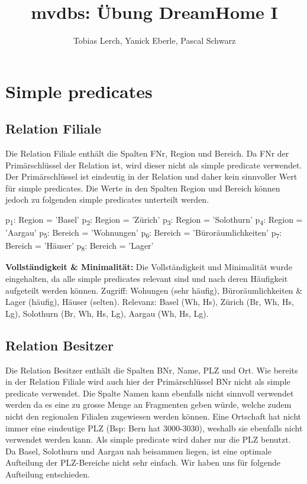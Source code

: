 \documentclass[11pt,a4paper,parskip=half]{scrartcl}
\title{mvdbs: Übung DreamHome I}
\author{Tobias Lerch, Yanick Eberle, Pascal Schwarz}
\begin{document}
\maketitle

\section{Simple predicates}
\subsection{Relation Filiale}
Die Relation Filiale enthält die Spalten FNr, Region und Bereich. Da FNr der Primärschlüssel der Relation ist, wird dieser nicht als simple predicate verwendet. Der Primärschlüssel ist eindeutig in der Relation und daher kein sinnvoller Wert für simple predicates. Die Werte in den Spalten Region und Bereich können jedoch zu folgenden simple predicates unterteilt werden.

p\textsubscript{1}: Region = 'Basel'\newline
p\textsubscript{2}: Region = 'Zürich'\newline
p\textsubscript{3}: Region = 'Solothurn'\newline
p\textsubscript{4}: Region = 'Aargau'\newline
\newline
p\textsubscript{5}: Bereich = 'Wohnungen'\newline
p\textsubscript{6}: Bereich = 'Büroräumlichkeiten'\newline
p\textsubscript{7}: Bereich = 'Häuser'\newline
p\textsubscript{8}: Bereich = 'Lager'\newline

\textbf{Vollständigkeit \& Minimalität: }
Die Vollständigkeit und Minimalität wurde eingehalten, da alle simple predicates relevant sind und nach deren Häufigkeit aufgeteilt werden können.\newline
Zugriff: Wohungen (sehr häufig),  Büroräumlichkeiten \& Lager (häufig), Häuser (selten).\newline
Relevanz: Basel (Wh, Hs), Zürich (Br, Wh, Hs, Lg), Solothurn (Br, Wh, Hs, Lg), Aargau (Wh, Hs, Lg).


\subsection{Relation Besitzer}
Die Relation Besitzer enthält die Spalten BNr, Name, PLZ und Ort. Wie bereits in der Relation Filiale wird auch hier der Primärschlüssel BNr nicht als simple predicate verwendet. Die Spalte Namen kann ebenfalls nicht sinnvoll verwendet werden da es eine zu grosse Menge an Fragmenten geben würde, welche zudem nicht den regionalen Filialen zugewiesen werden können. Eine Ortschaft hat nicht immer eine eindeutige PLZ (Bsp: Bern hat 3000-3030), weshalb sie ebenfalls nicht verwendet werden kann. Als simple predicate wird daher nur die PLZ benutzt. Da Basel, Solothurn und Aargau nah beisammen liegen, ist eine optimale Aufteilung der PLZ-Bereiche nicht sehr einfach. Wir haben uns für folgende Aufteilung entschieden.
\end{document}
